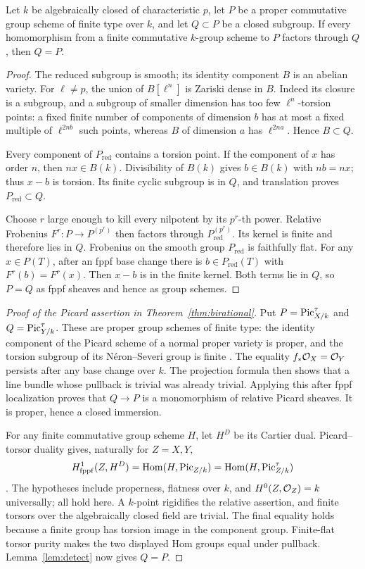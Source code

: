 \begin{lemma}\label{lem:detect}
Let $k$ be algebraically closed of characteristic $p$, let $P$
be a proper commutative group scheme of finite type over $k$, and
let $Q\subset P$ be a closed subgroup. If every homomorphism
from a finite commutative $k$-group scheme to $P$ factors through
$Q$, then $Q=P$.
\end{lemma}
\begin{proof}
The reduced subgroup is smooth; its identity component $B$ is
an abelian variety. For $\ell\ne p$, the union of $B[\ell^n]$
is Zariski dense in $B$. Indeed its closure is a subgroup, and
a subgroup of smaller dimension has too few $\ell^n$-torsion
points: a fixed finite number of components of dimension $b$
has at most a fixed multiple of $\ell^{2nb}$ such points,
whereas $B$ of dimension $a$ has $\ell^{2na}$. Hence $B\subset Q$.

Every component of $P_{\mathrm{red}}$ contains a torsion point.
If the component of $x$ has order $n$, then $nx\in B(k)$.
Divisibility of $B(k)$ gives $b\in B(k)$ with $nb=nx$; thus
$x-b$ is torsion. Its finite cyclic subgroup is in $Q$, and
translation proves $P_{\mathrm{red}}\subset Q$.

Choose $r$ large enough to kill every nilpotent by its $p^r$-th
power. Relative Frobenius $F^r:P\to P^{(p^r)}$ then factors
through $P_{\mathrm{red}}^{(p^r)}$. Its kernel is finite and
therefore lies in $Q$. Frobenius on the smooth group
$P_{\mathrm{red}}$ is faithfully flat. For any $x\in P(T)$,
after an fppf base change there is $b\in P_{\mathrm{red}}(T)$
with $F^r(b)=F^r(x)$. Then $x-b$ is in the finite kernel.
Both terms lie in $Q$, so $P=Q$ as fppf sheaves and hence as
group schemes.
\end{proof}

\begin{proof}[Proof of the Picard assertion in Theorem~\ref{thm:birational}]
Put $P=\operatorname{Pic}^\tau_{X/k}$ and $Q=\operatorname{Pic}^\tau_{Y/k}$. These are
proper group schemes of finite type: the identity component of
the Picard scheme of a normal proper variety is proper, and the
torsion subgroup of its N\'eron--Severi group is finite
\cite[Theorem 5.4, pp.~37--38; Remarks 5.6, p.~39, and 6.19,
p.~59]{Kleiman}.
The equality $f_*\mathcal O_X=\mathcal O_Y$ persists after any base change
over $k$. The projection formula then shows that a line bundle
whose pullback is trivial was already trivial. Applying this
after fppf localization proves that $Q\to P$ is a monomorphism
of relative Picard sheaves. It is proper, hence a closed immersion.

For any finite commutative group scheme $H$, let $H^D$ be its
Cartier dual. Picard--torsor duality gives, naturally for $Z=X,Y$,
\[
 H^1_{\mathrm{fppf}}(Z,H^D)
   =\operatorname{Hom}(H,\operatorname{Pic}_{Z/k})
   =\operatorname{Hom}(H,\operatorname{Pic}^\tau_{Z/k})
\]
\cite[Proposition 6.2.1, pp.~50--51]{RaynaudPicard}.
The hypotheses include properness, flatness over $k$, and
$H^0(Z,\mathcal O_Z)=k$ universally; all hold here. A $k$-point
rigidifies the relative assertion, and finite torsors over the
algebraically closed field are trivial. The final equality holds
because a finite group has torsion image in the component group.
Finite-flat torsor purity makes the two displayed Hom groups
equal under pullback. Lemma~\ref{lem:detect} now gives $Q=P$.
\end{proof}
